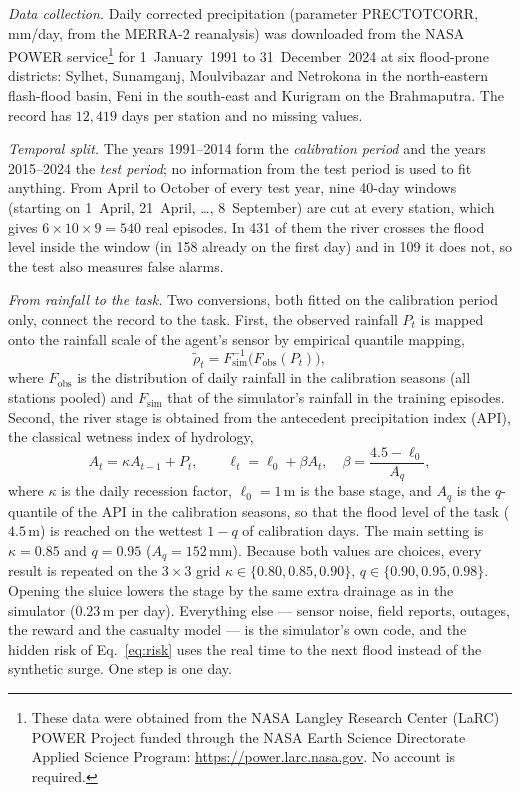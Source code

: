 \documentclass[journal]{IEEEtran}
\begin{document}
\textit{Data collection.} Daily corrected precipitation (parameter
PRECTOTCORR, mm/day, from the MERRA-2 reanalysis) was downloaded from the NASA
POWER service\footnote{These data were obtained from the NASA Langley
Research Center (LaRC) POWER Project funded through the NASA Earth Science
Directorate Applied Science Program: \url{https://power.larc.nasa.gov}. No
account is required.} for 1~January~1991 to 31~December~2024 at six
flood-prone districts: Sylhet, Sunamganj, Moulvibazar and Netrokona in the
north-eastern flash-flood basin, Feni in the south-east and Kurigram on the
Brahmaputra. The record has $12{,}419$ days per station and no missing values.

\textit{Temporal split.} The years 1991--2014 form the \emph{calibration
period} and the years 2015--2024 the \emph{test period}; no information from the
test period is used to fit anything. From April to October of every test year,
nine 40-day windows (starting on 1~April, 21~April, \dots, 8~September) are cut
at every station, which gives $6\times10\times9=540$ real episodes. In 431 of
them the river crosses the flood level inside the window (in 158 already on
the first day) and in 109 it does not, so the test also measures false
alarms.

\textit{From rainfall to the task.} Two conversions, both fitted on the
calibration period only, connect the record to the task. First, the observed
rainfall $P_t$ is mapped onto the rainfall scale of the agent's sensor by
empirical quantile mapping,
\begin{equation}
\tilde{\rho}_t=F_{\mathrm{sim}}^{-1}\big(F_{\mathrm{obs}}(P_t)\big),
\label{eq:qmap}
\end{equation}
where $F_{\mathrm{obs}}$ is the distribution of daily rainfall in the
calibration seasons (all stations pooled) and $F_{\mathrm{sim}}$ that of the
simulator's rainfall in the training episodes. Second, the river stage is
obtained from the antecedent precipitation index (API), the classical wetness
index of hydrology,
\begin{equation}
A_t=\kappa A_{t-1}+P_t,\qquad
\ell_t=\ell_0+\beta A_t,\quad \beta=\frac{4.5-\ell_0}{A_{q}},
\label{eq:api}
\end{equation}
where $\kappa$ is the daily recession factor, $\ell_0=1$\,m is the base stage,
and $A_q$ is the $q$-quantile of the API in the calibration seasons, so that
the flood level of the task ($4.5$\,m) is reached on the wettest $1-q$ of
calibration days. The main setting is $\kappa=0.85$ and $q=0.95$
($A_q=152$\,mm). Because both values are choices, every result is repeated on
the $3\times3$ grid $\kappa\in\{0.80,0.85,0.90\}$, $q\in\{0.90,0.95,0.98\}$.
Opening the sluice lowers the stage by the same extra drainage as in the
simulator ($0.23$\,m per day). Everything else --- sensor noise, field
reports, outages, the reward and the casualty model --- is the simulator's own
code, and the hidden risk of Eq.~\eqref{eq:risk} uses the real time to the next
flood instead of the synthetic surge. One step is one day.
\end{document}
